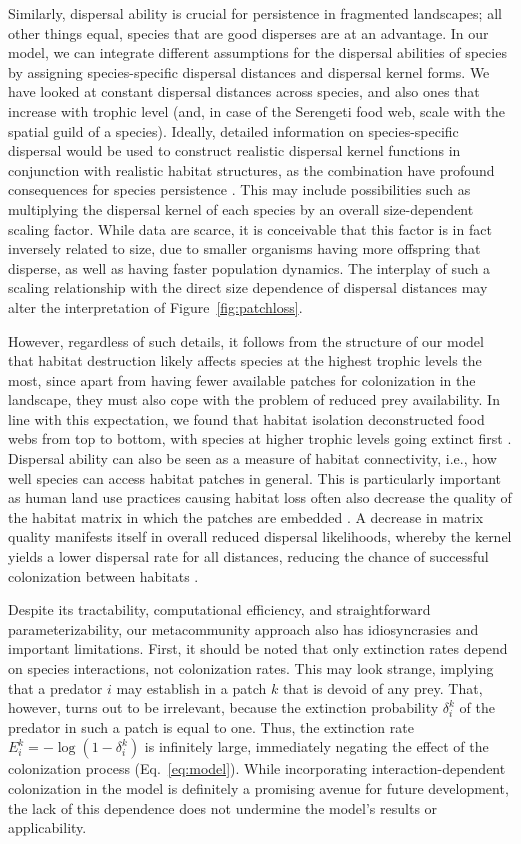 \documentclass[11pt]{article}
\begin{document}
Similarly, dispersal ability is crucial for persistence in fragmented landscapes; all other things equal, species that are good disperses are at an advantage. In our model, we can integrate different assumptions for the dispersal abilities of species by assigning species-specific dispersal distances and dispersal kernel forms. We have looked at constant dispersal distances across species, and also ones that increase with trophic level (and, in case of the Serengeti food web, scale with the spatial guild of a species). Ideally, detailed information on species-specific dispersal would be used to construct realistic dispersal kernel functions in conjunction with realistic habitat structures, as the combination have profound consequences for species persistence \citep{Arevalletal2018}. This may include possibilities such as multiplying the dispersal kernel of each species by an overall size-dependent scaling factor. While data are scarce, it is conceivable that this factor is in fact inversely related to size, due to smaller organisms having more offspring that disperse, as well as having faster population dynamics. The interplay of such a scaling relationship with the direct size dependence of dispersal distances may alter the interpretation of Figure~\ref{fig:patchloss}.

However, regardless of such details, it follows from the structure of our model that habitat destruction likely affects species at the highest trophic levels the most, since apart from having fewer available patches for colonization in the landscape, they must also cope with the problem of reduced prey availability. In line with this expectation, we found that habitat isolation deconstructed food webs from top to bottom, with species at higher trophic levels going extinct first \citep{Ryser2019, McWilliams2019}. Dispersal ability can also be seen as a measure of habitat connectivity, i.e., how well species can access habitat patches in general. This is particularly important as human land use practices causing habitat loss often also decrease the quality of the habitat matrix in which the patches are embedded \citep{Bonte2012}. A decrease in matrix quality manifests itself in overall reduced dispersal likelihoods, whereby the kernel yields a lower dispersal rate for all distances, reducing the chance of successful colonization between habitats \citep{Eklof2012}. 

Despite its tractability, computational efficiency, and straightforward parameterizability, our metacommunity approach also has idiosyncrasies and important limitations. First, it should be noted that only extinction rates depend on species interactions, not colonization rates. This may look strange, implying that a predator $i$ may establish in a patch $k$ that is devoid of any prey. That, however, turns out to be irrelevant, because the extinction probability $\delta_i^k$ of the predator in such a patch is equal to one. Thus, the extinction rate $E_i^k = -\log(1-\delta_i^k)$ is infinitely large, immediately negating the effect of the colonization process (Eq.~\ref{eq:model}). While incorporating interaction-dependent colonization in the model is definitely a promising avenue for future development, the lack of this dependence does not undermine the model's results or applicability.
\end{document}
